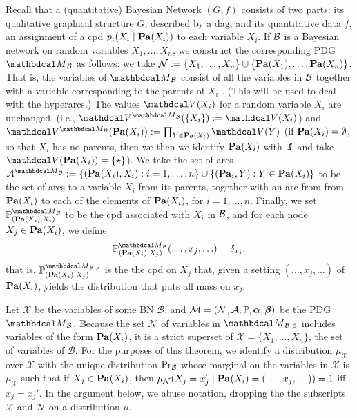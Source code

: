 \begin{subappendices}
\begin{defn}[BN to PDG]\label{def:bn2PDG}
Recall that a (quantitative) Bayesian Network $(G, f)$ consists of two
parts: its qualitative graphical structure $G$, 
described by a dag,
and its quantitative data $f$, an assignment of 
a cpd $p_i(X_i \mid \mathop{\mathbf{Pa}}(X_i))$ to each variable $X_i$.
If $\cal B$ is a Bayesian network on random variables
$X_1, \ldots, X_n$, we construct the corresponding PDG
$\PDGof{{\mathcal B}}$
			as follows: we take $\mathcal N := \{X_1, \ldots, X_n \} \cup
			\{ \mathop{\mathbf{Pa}}(X_1), \ldots, \mathop{\mathbf{Pa}}(X_n)\}$.  
That is, the variables of 
	  $\PDGof{{\mathcal B}}$
consist of all the variables in
${\cal B}$ together with a variable corresponding to the parents
of $X_i$%
.  (This will be used to deal with the hyperarcs.) 
			The values $\V(X_i)$ for a random variable
			$X_i$ are unchanged, 
(i.e., $\V^{\PDGof{{\mathcal B}}}(\{X_i\}) := \V(X_i)$)
and $\V^{\PDGof{{\mathcal B}}}(\Pa(X_i)) := \prod_{Y \in \Pa(X_i)} \V(Y)$
(if $\mathop{\mathbf{Pa}}(X_i) = \emptyset$, so that $X_i$ has no parents, then we 
then we identify $\mathop{\mathbf{Pa}}(X_i)$ with $\pdgunit$ and
take $\V(\Pa(X_i)) = \{\star\}$). 
We take the set of arcs $\Ar^{\PDGof{{\mathcal B}}} := \{ (\Pa(X_i), X_i) : 
i = 1, \ldots, n \} \cup \{ (\Pa_i, Y) : Y \in
			\Pa(X_i)\}$ to be the set of arcs to a variable $X_i$
	  from its parents, together with an arc from
	  from $\mathop{\mathbf{Pa}}(X_i)$ to each of the elements of $\mathop{\mathbf{Pa}}(X_i)$, for
	  $i = 1, \ldots, n$.  
	Finally, we set $\mathbb P^{\PDGof{{\mathcal
				B}}}_{(\Pa(X_i), X_i)}$ to be the cpd associated
			with $X_i$ in $\cal B$, and for each node $X_j \in \mathop{\mathbf{Pa}}(X_i)$,
			we define
	\[ \mathbb P^{\PDGof{\mathcal B}}_{(\Pa(X_i),
			  X_j)}(\ldots, x_j, \ldots) = \delta_{x_j};\]
that is,
$\mathbb P_{(\Pa(X_i), X_j)}^{\PDGof{\mathcal B, \beta}}$ is the the cpd 
on $X_j$ that, given a setting $(\ldots, x_j, \ldots)$ of $\mathop{\mathbf{Pa}}(X_i)$, yields the distribution that puts all mass on $x_j$. 
\end{defn}



Let $\mathcal X$ be the variables of some BN $\mathcal B$, and
$\mathcal M = (\mathcal N, \mathcal A, \mathbb P, \boldsymbol\alpha, \boldsymbol\beta)$ 
be the PDG $\PDGof{\mathcal B}$.
Because the set  $\mathcal N$ of variables in $\PDGof{{\mathcal
    B},\beta}$ includes  
variables of the form $\mathop{\mathbf{Pa}}(X_i)$, it is a strict superset of
$\mathcal X = \{X_1,\ldots, X_n\}$, the set of variables of $\mathcal B$.
For the purposes of this theorem, we identify a distribution
$\mu_{\mathcal X}$ over $\mathcal X$ 
with the unique distribution $\Pr_{\cal B}$ whose marginal on the
variables in $\mathcal X$ is $\mu_{\mathcal X}$ such that if $X_j \in
\mathop{\mathbf{Pa}}(X_i)$, then 
$\mu_{\mathcal N}(X_j = x_j' \mid \mathop{\mathbf{Pa}}(X_i) = (\ldots, x_j,\ldots)) =
1$ iff $x_j = x_j'$.  In the argument below, we abuse notation,
dropping the the subscripts $\mathcal X$ and $\mathcal N$ on a
distribution $\mu$.


\end{subappendices}
